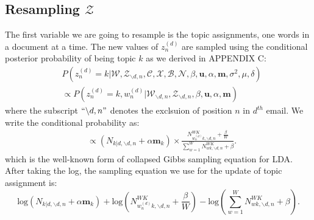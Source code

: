 \documentclass[a4paper]{article}
\begin{document}
 \subsection{Resampling $\mathcal{Z}$}  \label{subsec: Resampling Z}
 The first variable we are going to resample is the topic assignments, one words in a document at a time.  The new values of $z^{(d)}_n$ are sampled using the conditional posterior probability of being topic $k$ as we derived in APPENDIX C:
 \begin{equation}
 \begin{aligned} & 
 P(z^{(d)}_n=k|\mathcal{W}, \mathcal{Z}_{\backslash d, n},  \mathcal{C}, \mathcal{X}, \mathcal{B}, \mathcal{N},  \beta, \boldsymbol{u}, \alpha, \boldsymbol{m}, \sigma^2, \mu, \delta)\\
 & \propto P(z^{(d)}_n=k, w^{(d)}_n|\mathcal{W}_{\backslash d, n}, \mathcal{Z}_{\backslash d, n}, \beta, \boldsymbol{u}, \alpha, \boldsymbol{m})
 \end{aligned}
 \end{equation}
 where the subscript $``{\backslash d, n}"$ denotes the exclsuion of position $n$ in $d^{th}$ email. We write the conditional probability as:
 \begin{equation}
 \begin{aligned} 
 & \propto(N_{k|d, \backslash d, n}+\alpha \boldsymbol{m}_k)\times\frac{N_{w_n^{(d)}k, \backslash d, n}^{WK}+\frac{\beta}{W}}{\sum_{w=1}^WN_{wk,  \backslash d, n}^{WK}+\beta}.
 \end{aligned}
 \end{equation}
 which is the well-known form of collapsed Gibbs sampling equation for LDA. After taking the log, the sampling equation we use for the update of topic assignment is:
 \begin{equation}
 \mbox{log}(N_{k|d, \backslash d, n}+\alpha \boldsymbol{m}_k)+\mbox{log}(N_{w_n^{(d)}k, \backslash d, n}^{WK}+\frac{\beta}{W})-\mbox{log}({\sum_{w=1}^WN_{wk,  \backslash d, n}^{WK}+\beta}).
 \end{equation}
\end{document}
